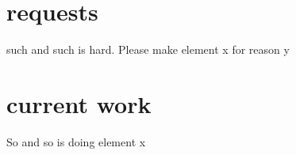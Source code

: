 \documentclass[10pt]{article}
\begin{document}
\section*{requests}
such and such is hard.
Please make element x for reason y



\section*{current work}
So and so is doing element x






\end{document}

